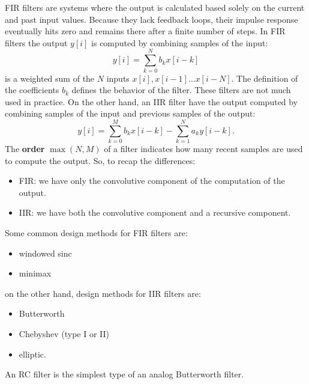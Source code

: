 \documentclass[10pt, letterpaper]{report}
\begin{document}
FIR filters are systems where the output is calculated based solely on the current and past input values. Because they lack feedback loops, their impulse response eventually hits zero and remains there after a finite number of steps. In FIR filters the output $y[i]$ is computed by combining samples of the input:\begin{equation}
     y[i]=\sum_{k=0}^{N}b_kx[i-k]
\end{equation}
is a weighted sum of the $N$ inputs $x[i],x[i-1]\dots x[i-N]$. The definition of the coefficients $b_k$ defines the behavior of the filter. These filters are not much used in practice. On the other hand, an IIR filter have the output computed by combining samples of the input and previous samples of the output:\begin{equation}
     y[i]=\sum_{k=0}^{M}b_kx[i-k]-\sum_{k=1}^{N}a_ky[i-k].
\end{equation}
The \textbf{order} $\max(N,M)$ of a filter indicates how many recent samples are used to compute the output. 
So, to recap the differences:\begin{itemize}
     \item FIR: we have only the convolutive component of the computation of the output. 
     \item IIR: we have both the convolutive component and a recursive component.
\end{itemize}
Some common design methods for FIR filters are:\begin{itemize}
     \item windowed sinc 
     \item minimax
\end{itemize}
on the other hand, design methods for IIR filters are:\begin{itemize}
     \item Butterworth
     \item Chebyshev (type I or II)
     \item elliptic.
\end{itemize}
An RC filter is the simplest type of an analog Butterworth filter. \bigskip
\end{document}
